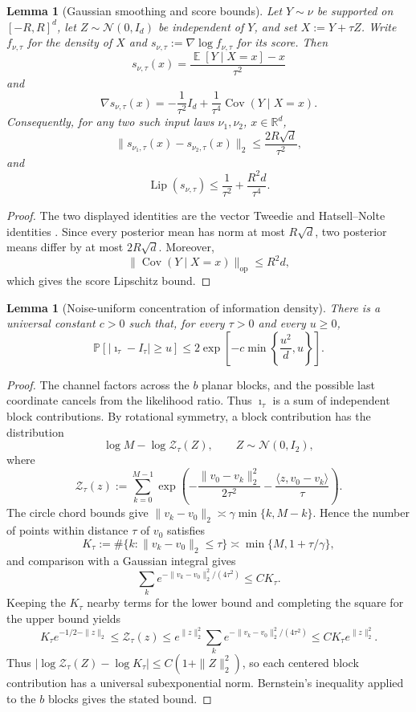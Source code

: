 \documentclass[11pt,letterpaper]{article}
\newtheorem{lemma}[theorem]{Lemma}
\newcommand{\R}{\mathbb{R}}
\DeclareMathOperator*{\E}{\mathbb{E}}
\newcommand{\1}{\mathbbm{1}}
\DeclareMathOperator{\Lip}{Lip}
\newcommand{\Prob}{\mathbb P}
\newcommand{\cN}{\mathcal N}
\begin{document}
\begin{lemma}[Gaussian smoothing and score bounds]
\label{lem:smoothing}
Let \(Y\sim\nu\) be supported on \([-R,R]^d\), let
\(Z\sim\cN(0,I_d)\) be independent of \(Y\), and set
\(X:=Y+\tau Z\).  Write \(f_{\nu,\tau}\) for the density of \(X\)
and \(s_{\nu,\tau}:=\nabla\log f_{\nu,\tau}\) for its score.  Then
\[
   s_{\nu,\tau}(x)
   =\frac{\E[Y\mid X=x]-x}{\tau^2}
\]
and
\[
   \nabla s_{\nu,\tau}(x)
   =-\frac1{\tau^2}I_d
    +\frac1{\tau^4}\operatorname{Cov}(Y\mid X=x).
\]
Consequently, for any two such input laws \(\nu_1,\nu_2\),
\(x\in\R^d\),
\[
   \|s_{\nu_1,\tau}(x)-s_{\nu_2,\tau}(x)\|_2
   \le\frac{2R\sqrt d}{\tau^2},
\]
and
\[
   \Lip(s_{\nu,\tau})
   \le\frac1{\tau^2}+\frac{R^2d}{\tau^4}.
\]
\end{lemma}

\begin{proof}
The two displayed identities are the vector Tweedie and
Hatsell--Nolte identities \cite{dytso-poor-shamai}.  Since every
posterior mean has norm at most \(R\sqrt d\), two posterior means
differ by at most \(2R\sqrt d\).  Moreover,
\[
   \|\operatorname{Cov}(Y\mid X=x)\|_{\mathrm{op}}\le R^2d,
\]
which gives the score Lipschitz bound.
\end{proof}

\begin{lemma}[Noise-uniform concentration of information density]
\label{lem:information-concentration}
There is a universal constant \(c>0\) such that, for every
\(\tau>0\) and every \(u\ge0\),
\[
   \Prob\left[
      |\imath_\tau-I_\tau|\ge u
   \right]
   \le
   2\exp\left[
      -c\min\left\{\frac{u^2}{d},u\right\}
   \right].
\]
\end{lemma}

\begin{proof}
The channel factors across the \(b\) planar blocks, and the possible
last coordinate cancels from the likelihood ratio.  Thus
\(\imath_\tau\) is a sum of independent block contributions.
By rotational symmetry, a block contribution has the distribution
\[
   \log M-\log\mathcal Z_\tau(Z),\qquad Z\sim\cN(0,I_2),
\]
where
\[
   \mathcal Z_\tau(z):=\sum_{k=0}^{M-1}
   \exp\left(
      -\frac{\|v_0-v_k\|_2^2}{2\tau^2}
      -\frac{\langle z,v_0-v_k\rangle}{\tau}
   \right).
\]
The circle chord bounds give
\(\|v_k-v_0\|_2\asymp\gamma\min\{k,M-k\}\).  Hence the number
of points within distance \(\tau\) of \(v_0\) satisfies
\[
   K_\tau:=\#\{k:\|v_k-v_0\|_2\le\tau\}
   \asymp\min\{M,1+\tau/\gamma\},
\]
and comparison with a Gaussian integral gives
\[
   \sum_k e^{-\|v_k-v_0\|_2^2/(4\tau^2)}\le C K_\tau.
\]
Keeping the \(K_\tau\) nearby terms for the lower bound and completing
the square for the upper bound yields
\[
   K_\tau e^{-1/2-\|z\|_2}
   \le\mathcal Z_\tau(z)
   \le e^{\|z\|_2^2}
      \sum_k e^{-\|v_k-v_0\|_2^2/(4\tau^2)}
   \le C K_\tau e^{\|z\|_2^2}.
\]
Thus \(|\log\mathcal Z_\tau(Z)-\log K_\tau|
\le C(1+\|Z\|_2^2)\), so each centered block contribution has
a universal subexponential norm.  Bernstein's inequality
\cite[Theorem~2.8.1]{vershynin2018} applied to the \(b\) blocks gives
the stated bound.
\end{proof}
\end{document}
